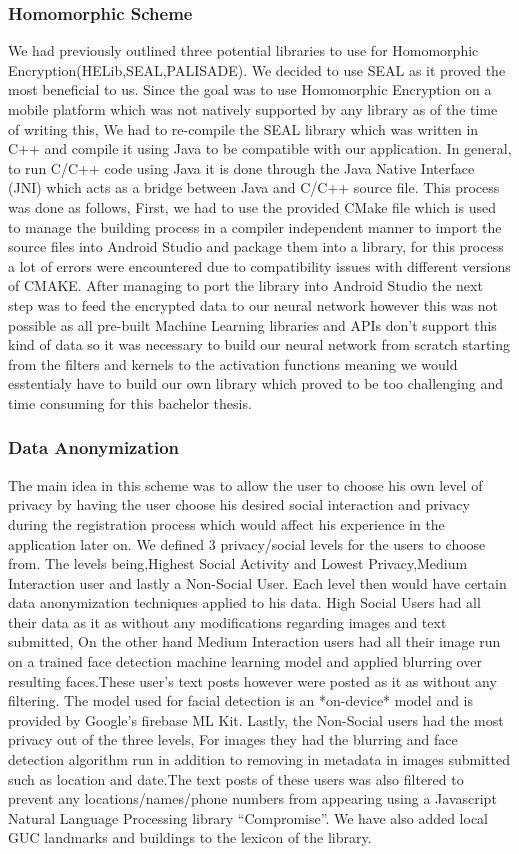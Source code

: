 \documentclass[10pt]{article}
\begin{document}
\subsubsection{Homomorphic Scheme}
We had previously outlined three potential libraries to use for Homomorphic Encryption(HELib,SEAL,PALISADE). We decided to use SEAL as it proved the most beneficial to us.
Since the goal was to use Homomorphic Encryption on a mobile platform which was not natively supported by any library as of the time of writing this, We had to re-compile the SEAL library which was written in C++ and compile it using Java to be compatible with our application.
In general, to run C/C++ code using Java it is done through the Java Native Interface (JNI) which acts as a bridge between Java and C/C++ source file. This process was done as follows, First, we had to use the provided CMake file which is used to manage the building process in a compiler independent manner to import the source files into Android Studio and package them into a library, for this process a lot of errors were encountered due to compatibility issues with different versions of CMAKE.
After managing to port the library into Android Studio the next step was to feed the encrypted data to our neural network however this was not possible as all pre-built Machine Learning libraries and APIs don't support this kind of data so it was necessary to build our neural network from scratch starting from the filters and kernels to the activation functions meaning we would esstentialy have to build our own library which proved to be too challenging and time consuming for this bachelor thesis.

\subsubsection{Data Anonymization}
The main idea in this scheme was to allow the user to choose his own level of privacy by having the user choose his desired social interaction and privacy during the registration process which would affect his experience in the application later on. We defined 3 privacy/social levels for the users to choose from. The levels being,Highest Social Activity and Lowest Privacy,Medium Interaction user and lastly a Non-Social User. Each level then would have certain data anonymization techniques applied to his data.
High Social Users had all their data as it as without any modifications regarding images and text submitted, On the other hand Medium Interaction users had all their image run on a trained face detection machine learning model and applied blurring over resulting faces.These user’s text posts however were posted as it as without any filtering. The model used for facial detection is an *on-device* model and is provided by Google’s firebase ML Kit.
Lastly, the Non-Social users had the most privacy out of the three levels, For images they had the blurring and face detection algorithm run in addition to removing in metadata in images submitted such as location and date.The text posts of these users was also filtered to prevent any locations/names/phone numbers from appearing using a Javascript Natural Language Processing library “Compromise”\cite{Compromise}. We have also added local GUC landmarks and buildings to the lexicon of the library.
\end{document}
